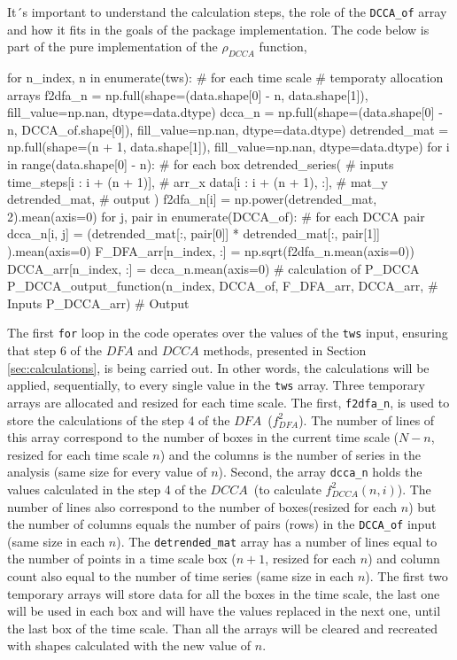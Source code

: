 \documentclass[article]{jss}
\begin{document}
It´s important to understand the calculation steps, the role of the \verb"DCCA_of" array and how it fits in the goals of the package implementation. The code below is part of the pure  implementation of the $\rho_{DCCA}$ function, 

\begin{Code}
for n_index, n  in enumerate(tws): # for each time scale
  # temporaty allocation arrays
  f2dfa_n = np.full(shape=(data.shape[0] - n, data.shape[1]),
  fill_value=np.nan, dtype=data.dtype)
  dcca_n = np.full(shape=(data.shape[0] - n, DCCA_of.shape[0]), 
  fill_value=np.nan, dtype=data.dtype)
  detrended_mat = np.full(shape=(n + 1, data.shape[1]), 
  fill_value=np.nan, dtype=data.dtype)
  for i in range(data.shape[0] - n): # for each box
      detrended_series( # inputs
                        time_steps[i : i + (n + 1)],  # arr_x
                        data[i : i + (n + 1), :],  # mat_y
                         detrended_mat,  # output
                      )
      f2dfa_n[i] = np.power(detrended_mat, 2).mean(axis=0)
      for j, pair in enumerate(DCCA_of): # for each DCCA pair
          dcca_n[i, j] = (detrended_mat[:, pair[0]] * detrended_mat[:, pair[1]]
                         ).mean(axis=0)
  F_DFA_arr[n_index, :] = np.sqrt(f2dfa_n.mean(axis=0))
  DCCA_arr[n_index, :] = dcca_n.mean(axis=0)
  # calculation of P_DCCA
  P_DCCA_output_function(n_index, DCCA_of, F_DFA_arr, DCCA_arr, # Inputs
  P_DCCA_arr) # Output
\end{Code}

The first \verb"for" loop in the code operates over the values of the \verb"tws" input, ensuring that step 6 of the $DFA$ and $DCCA$ methods, presented in Section \ref{sec:calculations}, is being carried out. In other words, the calculations will be applied, sequentially, to every single value in the \verb"tws" array. Three temporary arrays are allocated and resized for each time scale. The first, \verb"f2dfa_n", is used to store the calculations of the step 4 of the $DFA$~($f_{DFA}^{2}$). The number of lines of this array correspond to the number of boxes in the current time scale ($N - n$, resized for each time scale $n$) and the columns is the number of series in the analysis (same size for every value of $n$). Second, the array  \verb"dcca_n" holds the values calculated in the step 4 of the $DCCA$~(to calculate $f_{DCCA}^{2}(n, i)$). The number of lines also correspond to the number of boxes(resized for each $n$) but the number of columns equals the number of pairs (rows) in the \verb"DCCA_of" input (same size in each $n$). The \verb"detrended_mat" array has a number of lines equal to the number of points in a time scale box ($n +1$, resized for each $n$) and column count also equal to the number of time series (same size in each $n$). The first two temporary arrays will store data for all the boxes in the time scale, the last one will be used in each box and will have the values replaced in the next one, until the last box of the time scale. Than all the arrays will be cleared and recreated with shapes calculated with the new value of $n$.
\end{document}
